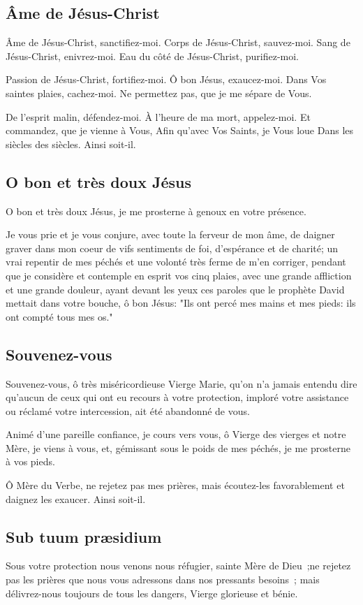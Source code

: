 
\subsection{Âme de Jésus-Christ}

Âme de Jésus-Christ, sanctifiez-moi. Corps de Jésus-Christ, sauvez-moi. Sang de Jésus-Christ, enivrez-moi. Eau du côté de Jésus-Christ, purifiez-moi. 

Passion de Jésus-Christ, fortifiez-moi. Ô bon Jésus, exaucez-moi. Dans Vos saintes plaies, cachez-moi. Ne permettez pas, que je me sépare de Vous. 

De l’esprit malin, défendez-moi. À l’heure de ma mort, appelez-moi. Et commandez, que je vienne à Vous, Afin qu’avec Vos Saints, je Vous loue Dans les siècles des siècles. Ainsi soit-il. 


\subsection{O bon et très doux Jésus}
O bon et très doux Jésus,
je me prosterne à genoux
en votre présence.

Je vous prie
et je vous conjure,
avec toute la ferveur de mon âme,
de daigner graver dans mon coeur
de vifs sentiments de foi,
d'espérance et de charité;
un vrai repentir de mes péchés
et une volonté très ferme
de m'en corriger,
pendant que je considère
et contemple en esprit vos cinq plaies,
avec une grande affliction
et une grande douleur,
ayant devant les yeux
ces paroles que le prophète David
mettait dans votre bouche,
ô bon Jésus:
"Ils ont percé mes mains et mes pieds:
ils ont compté tous mes os."

\subsection{Souvenez-vous}
Souvenez-vous, ô très miséricordieuse Vierge Marie, qu’on n’a jamais entendu dire qu’aucun de ceux qui ont eu recours à votre protection, imploré votre assistance ou réclamé votre intercession, ait été abandonné de vous.

Animé d’une pareille confiance, je cours vers vous, ô Vierge des vierges et notre Mère, je viens à vous, et, gémissant sous le poids de mes péchés, je me prosterne à vos pieds.

Ô Mère du Verbe, ne rejetez pas mes prières, mais écoutez-les favorablement et daignez les exaucer. Ainsi soit-il.

\subsection{Sub tuum præsidium}
%
 {Sous votre protection nous venons nous réfugier, sainte Mère de Dieu~;ne rejetez pas les prières que nous vous adressons dans nos pressants besoins ; mais délivrez-nous toujours de tous les dangers, Vierge glorieuse et bénie.}